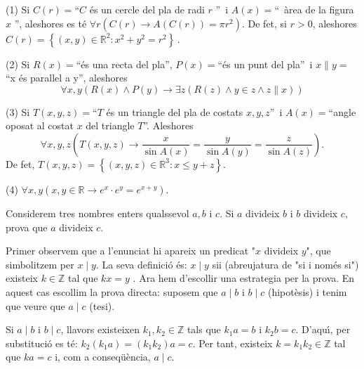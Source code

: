 \begin{solucio}
(1) Si $C(r)=$\textquotedblleft$C$ \'{e}s un cercle del pla de radi $r$%
\textquotedblright\ i $A(x)=$\textquotedblleft\ \`{a}rea de la figura $x$%
\textquotedblright, aleshores es t\'{e} $\forall r\left( C(r)\longrightarrow
A(C(r))=\pi r^{2}\right) $. De fet, si $r>0$, aleshores $C(r)=\left\{ \left(
x,y\right) \in\mathbb{R}^{2}:x^{2}+y^{2}=r^{2}\right\} \,$.

(2) Si $R(x)=$\textquotedblleft\'{e}s una recta del pla\textquotedblright, $%
P(x)=$\textquotedblleft\'{e}s un punt del pla\textquotedblright\ i $%
x\parallel y=$\textquotedblleft x \'{e}s paral\textperiodcentered lel a
y\textquotedblright, aleshores%
\begin{equation*}
\forall x,y\left( R(x)\wedge P(y)\longrightarrow\exists z\left( R(z)\wedge
y\in z\wedge z\parallel x\right) \right)
\end{equation*}

(3) Si $T(x,y,z)=$\textquotedblleft$T$ \'{e}s un triangle del pla de costats
$x,y,z$\textquotedblright\ i $A(x)=$\textquotedblleft angle oposat al costat
$x$ del triangle $T$\textquotedblright. Aleshores%
\begin{equation*}
\forall x,y,z\left( T(x,y,z)\longrightarrow\frac{x}{\sin A(x)}=\frac{y}{\sin
A(y)}=\frac{z}{\sin A(z)}\right) \text{.}
\end{equation*}
De fet, $T(x,y,z)=\left\{ (x,y,z)\in\mathbb{R}^{3}:x\leq y+z\right\} $.

(4) $\forall x,y\left( x,y\in\mathbb{R}\longrightarrow e^{x}\cdot
e^{y}=e^{x+y}\right) $.
\end{solucio}

\begin{exem}
Considerem tres nombres enters qualssevol $a,b$ i $c$. Si $a$ divideix $b$ i
$b$ divideix $c$, prova que $a$ divideix $c$.
\end{exem}

\begin{solucio}
Primer observem que a l'enunciat hi apareix un predicat "$x$ divideix $y$",
que simbolitzem per $x\mid y$. La seva definici\'{o} \'{e}s: $x\mid y$ sii
(abreujatura de "si i nom\'{e}s si") existeix $k\in\mathbb{Z}$ tal que $kx=y$%
. Ara hem d'escollir una estrategia per la prova. En aquest cas escollim la
prova directa: suposem que $a\mid b$ i $b\mid c$ (hipot\`{e}sis) i tenim que
veure que $a\mid c$ (tesi).

Si $a\mid b$ i $b\mid c$, llavors existeixen $k_{1},k_{2}\in\mathbb{Z}$ tals
que $k_{1}a=b$ i $k_{2}b=c$. D'aqu\'{\i}, per substituci\'{o} es t\'{e}: $%
k_{2}\left( k_{1}a\right) =\left( k_{1}k_{2}\right) a=c$. Per tant, existeix
$k=k_{1}k_{2}\in\mathbb{Z}$ tal que $ka=c$ i, com a conseq\"{u}\`{e}ncia, $%
a\mid c$.
\end{solucio}

